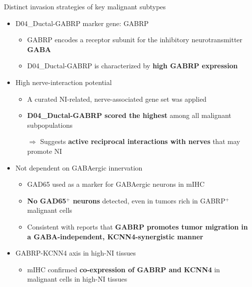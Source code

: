 \documentclass[10pt]{beamer}
\theoremstyle{plain}
\begin{document}
\begin{frame}{Distinct invasion strategies of key malignant subtypes}
  \begin{itemize}
    \item D04\_Ductal-GABRP marker gene: GABRP
      \begin{itemize}
        \item GABRP encodes a receptor subunit for the inhibitory neurotransmitter \textbf{GABA}
        \item D04\_Ductal-GABRP is characterized by \textbf{high GABRP expression}
      \end{itemize}

    \item High nerve-interaction potential
      \begin{itemize}
        \item A curated NI-related, nerve-associated gene set was applied
        \item \textbf{D04\_Ductal-GABRP scored the highest} among all malignant subpopulations

              \(\Rightarrow\) Suggests \textbf{active reciprocal interactions with nerves} that may promote NI
      \end{itemize}

    \item Not dependent on GABAergic innervation
      \begin{itemize}
        \item GAD65 used as a marker for GABAergic neurons in mIHC
        \item \textbf{No GAD65\(^{+}\) neurons} detected, even in tumors rich in GABRP\(^{+}\) malignant cells
        \item Consistent with reports that \textbf{GABRP promotes tumor migration in a GABA-independent, KCNN4-synergistic manner}
      \end{itemize}

    \item GABRP-KCNN4 axis in high-NI tissues
      \begin{itemize}
        \item mIHC confirmed \textbf{co-expression of GABRP and KCNN4} in malignant cells in high-NI tissues
      \end{itemize}
  \end{itemize}
\end{frame}
\end{document}
